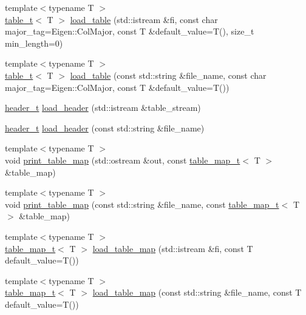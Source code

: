 \begin{DoxyCompactItemize}
\item 
{\footnotesize template$<$typename T $>$ }\\\hyperlink{namespaceIceBRG_a59734b1a7b525d7d926f69a91bc8553b}{table\+\_\+t}$<$ T $>$ \hyperlink{namespaceIceBRG_ae243e8ce14d6e346cceab63a4d76637a}{load\+\_\+table} (std\+::istream \&fi, const char major\+\_\+tag=Eigen\+::\+Col\+Major, const T \&default\+\_\+value=T(), size\+\_\+t min\+\_\+length=0)
\item 
{\footnotesize template$<$typename T $>$ }\\\hyperlink{namespaceIceBRG_a59734b1a7b525d7d926f69a91bc8553b}{table\+\_\+t}$<$ T $>$ \hyperlink{namespaceIceBRG_ac978c55b40895ee8d5d3731532e4b1c7}{load\+\_\+table} (const std\+::string \&file\+\_\+name, const char major\+\_\+tag=Eigen\+::\+Col\+Major, const T \&default\+\_\+value=T())
\item 
\hyperlink{namespaceIceBRG_a49e8b48f1dbd351e9748e7cbe80705df}{header\+\_\+t} \hyperlink{namespaceIceBRG_a047b573042d337c558184344d9d7fae1}{load\+\_\+header} (std\+::istream \&table\+\_\+stream)
\item 
\hyperlink{namespaceIceBRG_a49e8b48f1dbd351e9748e7cbe80705df}{header\+\_\+t} \hyperlink{namespaceIceBRG_adc28049500e5c5e79d321cc31847267a}{load\+\_\+header} (const std\+::string \&file\+\_\+name)
\item 
{\footnotesize template$<$typename T $>$ }\\void \hyperlink{namespaceIceBRG_a1379800d6e0cafd9a437e456e95a3b1f}{print\+\_\+table\+\_\+map} (std\+::ostream \&out, const \hyperlink{namespaceIceBRG_a30d3b56b57feeb81f66815ff1bfaec6c}{table\+\_\+map\+\_\+t}$<$ T $>$ \&table\+\_\+map)
\item 
{\footnotesize template$<$typename T $>$ }\\void \hyperlink{namespaceIceBRG_aabd3e256b75420ca59af04c81c9bae99}{print\+\_\+table\+\_\+map} (const std\+::string \&file\+\_\+name, const \hyperlink{namespaceIceBRG_a30d3b56b57feeb81f66815ff1bfaec6c}{table\+\_\+map\+\_\+t}$<$ T $>$ \&table\+\_\+map)
\item 
{\footnotesize template$<$typename T $>$ }\\\hyperlink{namespaceIceBRG_a30d3b56b57feeb81f66815ff1bfaec6c}{table\+\_\+map\+\_\+t}$<$ T $>$ \hyperlink{namespaceIceBRG_a845530aefc4255d4d98730502e0ad5b6}{load\+\_\+table\+\_\+map} (std\+::istream \&fi, const T default\+\_\+value=T())
\item 
{\footnotesize template$<$typename T $>$ }\\\hyperlink{namespaceIceBRG_a30d3b56b57feeb81f66815ff1bfaec6c}{table\+\_\+map\+\_\+t}$<$ T $>$ \hyperlink{namespaceIceBRG_a3f55c2c1511c52252fc04d73b77fe777}{load\+\_\+table\+\_\+map} (const std\+::string \&file\+\_\+name, const T default\+\_\+value=T())

\end{DoxyCompactItemize}
